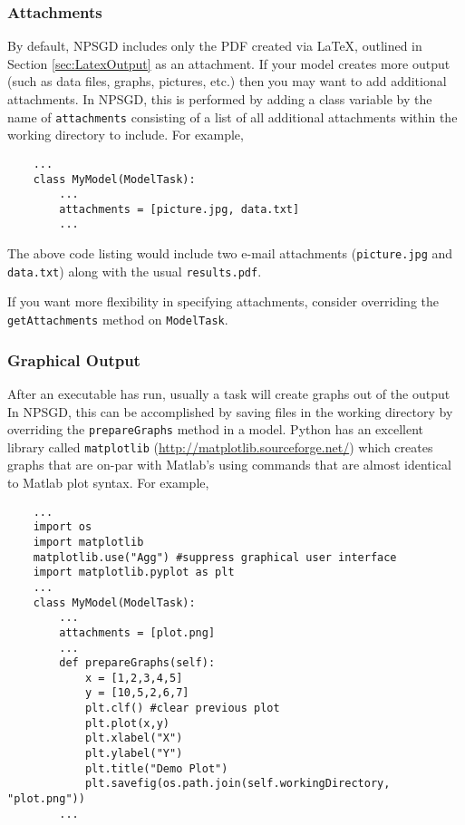 \documentclass{article}
\newcommand{\mpath}[1]{\texttt{#1}}
\begin{document}
\subsubsection{Attachments}
\label{sec:attachments}
By default, NPSGD includes only the PDF created via \LaTeX, outlined in Section
\ref{sec:LatexOutput} as an attachment. If your model creates more output (such
as data files, graphs, pictures, etc.) then you may want to add additional
attachments. In NPSGD, this is performed by adding a class variable by the name
of \texttt{attachments} consisting of a list of all additional attachments
within the working directory to include. For example,
\begin{lstlisting}
    ...
    class MyModel(ModelTask):
        ...
        attachments = [picture.jpg, data.txt]
        ...
\end{lstlisting}
The above code listing would include two e-mail attachments (\mpath{picture.jpg}
and \mpath{data.txt}) along with the usual \mpath{results.pdf}.

If you want more flexibility in specifying attachments, consider overriding the
\texttt{getAttachments} method on \texttt{ModelTask}.

\subsubsection{Graphical Output}
After an executable has run, usually a task will create graphs out of the output
In NPSGD, this can be accomplished by saving files in the working
directory by overriding the \texttt{prepareGraphs} method in a model. Python has
an excellent library called \texttt{matplotlib}
(\url{http://matplotlib.sourceforge.net/}) which creates graphs that are on-par
with Matlab's using commands that are almost identical to Matlab plot syntax.
For example,
\begin{lstlisting}
    ...
    import os
    import matplotlib
    matplotlib.use("Agg") #suppress graphical user interface
    import matplotlib.pyplot as plt
    ...
    class MyModel(ModelTask):
        ...
        attachments = [plot.png]
        ...
        def prepareGraphs(self):
            x = [1,2,3,4,5]
            y = [10,5,2,6,7]
            plt.clf() #clear previous plot
            plt.plot(x,y)
            plt.xlabel("X")
            plt.ylabel("Y")
            plt.title("Demo Plot")
            plt.savefig(os.path.join(self.workingDirectory, "plot.png"))
        ...
\end{lstlisting}
\end{document}
